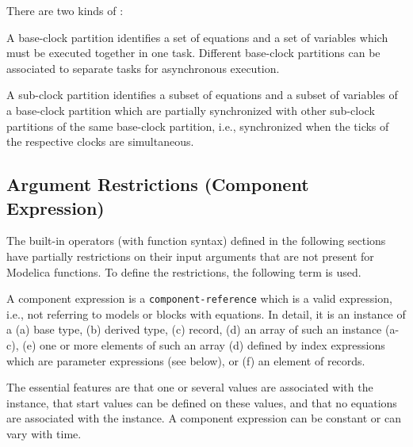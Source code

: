 There are two kinds of :

\begin{definition}
A base-clock partition identifies a set of equations and a set of variables which must be executed together in one task.  Different base-clock partitions can be associated to separate tasks for
asynchronous execution.
\end{definition}

\begin{definition}
A sub-clock partition identifies a subset of equations and a subset of variables of a base-clock partition which are partially synchronized with other sub-clock partitions of the same base-clock
partition, i.e., synchronized when the ticks of the respective clocks are simultaneous.
\end{definition}

\subsection{Argument Restrictions (Component Expression)}\label{argument-restrictions-component-expression}

The built-in operators (with function syntax) defined in the following
sections have partially restrictions on their input arguments that are
not present for Modelica functions. To define the restrictions, the
following term is used.

\begin{definition}\label{def:component-expression}
A component expression is a \lstinline[language=grammar]!component-reference! which is a valid expression, i.e., not referring to models or blocks with equations.
In detail, it is an instance of a (a) base type, (b) derived type, (c) record, (d) an array of such an instance (a-c), (e) one or more elements of such an array (d) defined by index expressions which are parameter expressions (see below), or (f) an element of records.
\begin{nonnormative}
The essential features are that one or several values are associated with the instance, that start values can be defined on these values, and that no equations are associated with the instance.
A component expression can be constant or can vary with time.
\end{nonnormative}
\end{definition}

